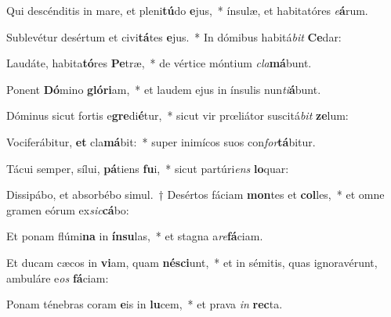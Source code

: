 \item Qui descénditis in mare, et pleni\textbf{tú}do \textbf{e}jus,~* ínsulæ, et habitatóres \textit{e}\textbf{á}rum.
\item Sublevétur desértum et civi\textbf{tá}tes \textbf{e}jus.~* In dómibus habitá\textit{bit} \textbf{Ce}dar:
\item Laudáte, habita\textbf{tó}res \textbf{Pe}træ,~* de vértice móntium \textit{cla}\textbf{má}bunt.
\item Ponent \textbf{Dó}mino \textbf{gló}\textbf{ri}am,~* et laudem ejus in ínsulis nun\textit{ti}\textbf{á}bunt.
\item Dóminus sicut fortis e\textbf{gre}di\textbf{é}tur,~* sicut vir prœliátor suscitá\textit{bit} \textbf{ze}lum:
\item Vociferábitur, \textbf{et} cla\textbf{má}bit:~* super inimícos suos con\textit{for}\textbf{tá}bitur.
\item Tácui semper, sílui, \textbf{pá}tiens \textbf{fu}i,~* sicut partúri\textit{ens} \textbf{lo}quar:
\item Dissipábo, et absorbébo simul.~† Desértos fáciam \textbf{mon}tes et \textbf{col}les,~* et omne gramen eórum ex\textit{sic}\textbf{cá}bo:
\item Et ponam flúmi\textbf{na} in \textbf{ín}\textbf{su}las,~* et stagna a\textit{re}\textbf{fá}ciam.
\item Et ducam cæcos in \textbf{vi}am, quam \textbf{né}\textbf{sci}unt,~* et in sémitis, quas ignoravérunt, ambuláre e\textit{os} \textbf{fá}ciam:
\item Ponam ténebras coram \textbf{e}is in \textbf{lu}cem,~* et prava \textit{in} \textbf{rec}ta.
